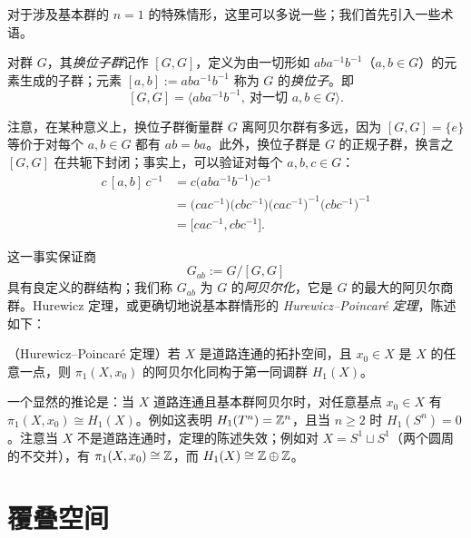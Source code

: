 对于涉及基本群的 $n=1$ 的特殊情形，这里可以多说一些；我们首先引入一些术语。

\begin{definition}[1.21]
对群 $G$，其\emph{换位子群}记作 $[G,G]$，定义为由一切形如 $aba^{-1}b^{-1}$（$a,b\in G$）的元素生成的子群；元素 $[a,b]:=aba^{-1}b^{-1}$ 称为 $G$ 的\emph{换位子}。即
\[
[G,G]=\bigl\langle aba^{-1}b^{-1},\ \text{对一切 } a,b\in G\bigr\rangle.
\]
\end{definition}

注意，在某种意义上，换位子群衡量群 $G$ 离阿贝尔群有多远，因为 $[G,G]=\{e\}$ 等价于对每个 $a,b\in G$ 都有 $ab=ba$。此外，换位子群是 $G$ 的正规子群，换言之 $[G,G]$ 在共轭下封闭；事实上，可以验证对每个 $a,b,c\in G$：
\[
\begin{aligned}
c\,[a,b]\,c^{-1}
&=c\bigl(aba^{-1}b^{-1}\bigr)c^{-1}\\
&=\bigl(cac^{-1}\bigr)\bigl(cbc^{-1}\bigr)\bigl(cac^{-1}\bigr)^{-1}\bigl(cbc^{-1}\bigr)^{-1}\\
&=\bigl[cac^{-1},cbc^{-1}\bigr].
\end{aligned}
\]

这一事实保证商
\[
G_{ab}:=G/[G,G]
\]
具有良定义的群结构；我们称 $G_{ab}$ 为 $G$ 的\emph{阿贝尔化}，它是 $G$ 的最大的阿贝尔商群。Hurewicz 定理，或更确切地说基本群情形的 \emph{Hurewicz--Poincaré 定理}，陈述如下：

\begin{theorem}[1.22]
（Hurewicz--Poincaré 定理）若 $X$ 是道路连通的拓扑空间，且 $x_0\in X$ 是 $X$ 的任意一点，则 $\pi_1(X,x_0)$ 的阿贝尔化同构于第一同调群 $H_1(X)$。
\end{theorem}


一个显然的推论是：当 $X$ 道路连通且基本群阿贝尔时，对任意基点 $x_0\in X$ 有 $\pi_1(X,x_0)\cong H_1(X)$。例如这表明 $H_1(T^n)=\mathbb{Z}^n$，且当 $n\ge2$ 时 $H_1(S^n)=0$。注意当 $X$ 不是道路连通时，定理的陈述失效；例如对 $X=S^1\sqcup S^1$（两个圆周的不交并），有 $\pi_1(X,x_0)\cong\mathbb{Z}$，而 $H_1(X)\cong\mathbb{Z}\oplus\mathbb{Z}$。


\chapter{覆叠空间}

